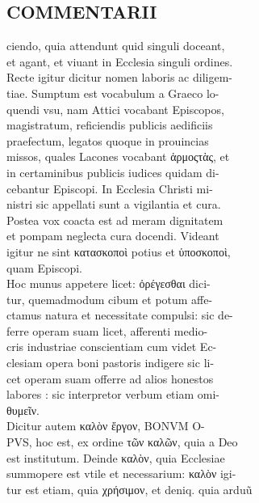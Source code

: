 \documentclass{article}
\begin{document}
\begin{pages}
\section*{COMMENTARII \\
                }ciendo, quia attendunt quid singuli doceant, \\
                et agant, et viuant in Ecclesia singuli ordines. \\
                Recte igitur dicitur nomen laboris ac diligem- \\
                tiae. Sumptum est vocabulum a Graeco lo- \\
                quendi vsu, nam Attici vocabant Episcopos, \\
                magistratum, reficiendis publicis aedificiis \\
                praefectum, legatos quoque in prouincias \\
                missos, quales Lacones vocabant ἁρμοςτὰς, et \\
                in certaminibus publicis iudices quidam di- \\
                cebantur Episcopi. In Ecclesia Christi mi- \\
                nistri sic appellati sunt a vigilantia et cura. \\
                Postea vox coacta est ad meram dignitatem \\
                et pompam neglecta cura docendi. Videant \\
                igitur ne sint κατασκοποὶ potius et ὑποσκοποὶ, \\
                quam Episcopi. \\
                Hoc munus appetere licet: ὀρέγεσθαι dici- \\
                tur, quemadmodum cibum et potum affe- \\
                ctamus natura et necessitate compulsi: sic de- \\
                ferre operam suam licet, afferenti medio- \\
                cris industriae conscientiam cum videt Ec- \\
                clesiam opera boni pastoris indigere sic li- \\
                cet operam suam offerre ad alios honestos \\
                labores : sic interpretor verbum etiam omi- \\
                θυμεῖν. \\
                Dicitur autem καλὸν ἔργον, BONVM O- \\
                PVS, hoc est, ex ordine τῶν καλῶν, quia a Deo \\
                est institutum. Deinde καλὸν, quia Ecclesiae \\
                summopere est vtile et necessarium: καλὸν igi- \\
                tur est etiam, quia χρήσιμον, et deniq. quia arduũ \\
                

\end{pages}
\end{document}
